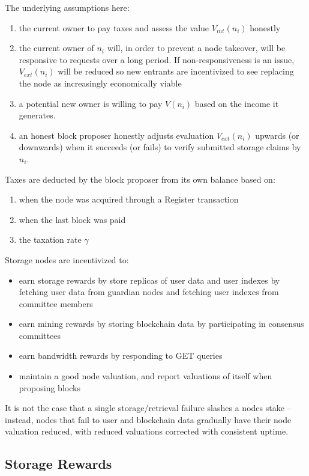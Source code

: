 \documentclass[journal]{IEEEtran}
\newcommand{\tx}[1]{\textsf{#1}}
\begin{document}
The underlying assumptions here:
\begin{enumerate}
    \item the current owner to pay taxes and assess the value $V_{int}(n_i)$ honestly
    \item the current owner of $n_i$ will, in order to prevent a node takeover, will be responsive to requests over a long period.  If non-responsiveness is an issue, $V_{ext}(n_i)$ will  be reduced so  new entrants are incentivized to see replacing the node as increasingly economically viable \item a potential new owner is willing to pay $V(n_i)$  based on the income it generates.
    \item an honest block proposer honestly adjusts evaluation $V_{ext}(n_i)$  upwards (or downwards) when it succeeds (or fails) to verify submitted storage claims by $n_i$.
\end{enumerate}
Taxes are deducted by the block proposer from its own balance based on:
\begin{enumerate}
    \item when the node was acquired through a \tx{Register} transaction
    \item when the last block was paid
    \item the taxation rate $\gamma$
\end{enumerate}

Storage nodes are incentivized to:
\begin{itemize}
    \item earn storage rewards by store replicas of user data and user indexes by fetching user data from guardian nodes and fetching user indexes from committee members
    \item earn mining rewards by storing blockchain data by participating in consensus committees
    \item earn bandwidth rewards by responding to GET queries
    \item maintain a good node valuation, and report valuations of itself when proposing blocks
\end{itemize}

It is not the case that a single storage/retrieval failure slashes a nodes stake -- instead, nodes that fail to user and blockchain data gradually have their node valuation reduced, with reduced valuations corrected with consistent uptime.

\subsection{Storage Rewards}
\end{document}
